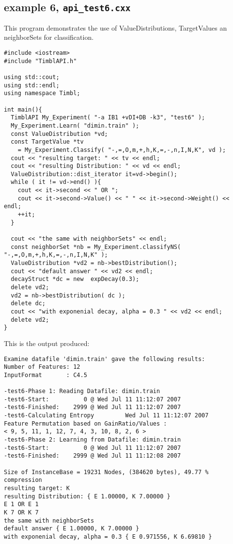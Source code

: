 \documentclass{report}
\begin{document}
\subsection{example 6, {\tt api\_test6.cxx}}

This program demonstrates the use of ValueDistributions, TargetValues
an neighborSets for classification.

\begin{footnotesize}
\begin{verbatim}
#include <iostream>
#include "TimblAPI.h"

using std::cout;
using std::endl;
using namespace Timbl;

int main(){
  TimblAPI My_Experiment( "-a IB1 +vDI+DB -k3", "test6" );
  My_Experiment.Learn( "dimin.train" ); 
  const ValueDistribution *vd;
  const TargetValue *tv
    = My_Experiment.Classify( "-,=,O,m,+,h,K,=,-,n,I,N,K", vd );
  cout << "resulting target: " << tv << endl;
  cout << "resulting Distribution: " << vd << endl;
  ValueDistribution::dist_iterator it=vd->begin();
  while ( it != vd->end() ){
    cout << it->second << " OR ";
    cout << it->second->Value() << " " << it->second->Weight() << endl;
    ++it;
  }

  cout << "the same with neighborSets" << endl;
  const neighborSet *nb = My_Experiment.classifyNS( "-,=,O,m,+,h,K,=,-,n,I,N,K" );
  ValueDistribution *vd2 = nb->bestDistribution();
  cout << "default answer " << vd2 << endl;
  decayStruct *dc = new  expDecay(0.3);
  delete vd2;
  vd2 = nb->bestDistribution( dc );
  delete dc;
  cout << "with exponenial decay, alpha = 0.3 " << vd2 << endl;  
  delete vd2;
}
\end{verbatim}
\end{footnotesize}

This is the output produced:

\begin{footnotesize}
\begin{verbatim}
Examine datafile 'dimin.train' gave the following results:
Number of Features: 12
InputFormat       : C4.5

-test6-Phase 1: Reading Datafile: dimin.train
-test6-Start:          0 @ Wed Jul 11 11:12:07 2007
-test6-Finished:    2999 @ Wed Jul 11 11:12:07 2007
-test6-Calculating Entropy         Wed Jul 11 11:12:07 2007
Feature Permutation based on GainRatio/Values :
< 9, 5, 11, 1, 12, 7, 4, 3, 10, 8, 2, 6 >
-test6-Phase 2: Learning from Datafile: dimin.train
-test6-Start:          0 @ Wed Jul 11 11:12:07 2007
-test6-Finished:    2999 @ Wed Jul 11 11:12:08 2007

Size of InstanceBase = 19231 Nodes, (384620 bytes), 49.77 % compression
resulting target: K
resulting Distribution: { E 1.00000, K 7.00000 }
E 1 OR E 1
K 7 OR K 7
the same with neighborSets
default answer { E 1.00000, K 7.00000 }
with exponenial decay, alpha = 0.3 { E 0.971556, K 6.69810 }
\end{verbatim}
\end{footnotesize}
\end{document}
